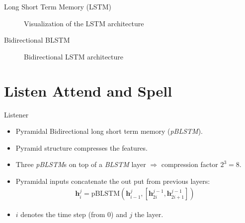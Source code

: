 \documentclass{beamer}
\begin{document}
\begin{frame}{Long Short Term Memory (LSTM)}
\begin{figure}

\caption{Visualization of the LSTM architecture}
\label{fig:lstm}
\end{figure}
\end{frame}

\begin{frame}{Bidirectional BLSTM}
\begin{figure}

\caption{Bidirectional LSTM architecture}
\label{fig:blstm}
\end{figure}
\end{frame}


\section{Listen Attend and Spell}


\begin{frame}{Listener}
\begin{itemize}
	\item Pyramidal Bidirectional long short term memory (\textit{pBLSTM}).
	\item Pyramid structure compresses the features. 
	\item Three \textit{pBLSTM}s on top of a \textit{BLSTM} layer $\Rightarrow$ compression factor $2^3 = 8 $.
	\item Pyramidal inputs concatenate the out put from previous layers:
		  \begin{align}
		  	\mathbf{h}_i^j = \text{pBLSTM}(\mathbf{h}_{i-1}^j, [\mathbf{h}_{2i}^{j-1}, \mathbf{h}_{2i+1}^{j-1}])
		  \end{align}
	\item $i$ denotes the time step (from $0$) and $j$ the layer.
\end{itemize}
\end{frame}
\end{document}
